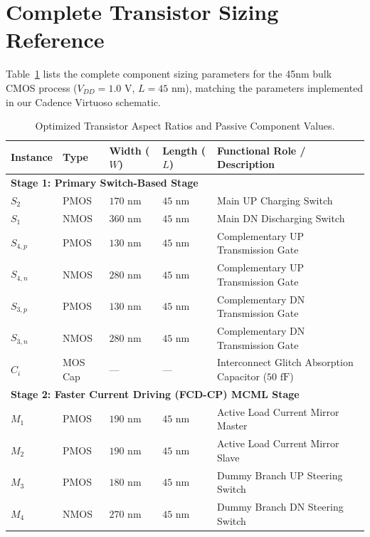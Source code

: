 \documentclass[11pt,a4paper]{report}
\begin{document}
\section{Complete Transistor Sizing Reference}
Table~\ref{tab:sizing_table} lists the complete component sizing parameters for the 45nm bulk CMOS process ($V_{DD} = 1.0\text{ V}$, $L = 45\text{ nm}$), matching the parameters implemented in our Cadence Virtuoso schematic.

\begin{table}[H]
    \centering
    \caption{Optimized Transistor Aspect Ratios and Passive Component Values.}
    \label{tab:sizing_table}
    \begin{tabularx}{\textwidth}{llllX}
        \toprule
        \textbf{Instance} & \textbf{Type} & \textbf{Width ($W$)} & \textbf{Length ($L$)} & \textbf{Functional Role / Description} \\
        \midrule
        \multicolumn{5}{l}{\textbf{Stage 1: Primary Switch-Based Stage}} \\
        $S_2$ & PMOS & $170\text{ nm}$ & $45\text{ nm}$ & Main UP Charging Switch \\
        $S_1$ & NMOS & $360\text{ nm}$ & $45\text{ nm}$ & Main DN Discharging Switch \\
        $S_{4,p}$ & PMOS & $130\text{ nm}$ & $45\text{ nm}$ & Complementary UP Transmission Gate \\
        $S_{4,n}$ & NMOS & $280\text{ nm}$ & $45\text{ nm}$ & Complementary UP Transmission Gate \\
        $S_{3,p}$ & PMOS & $130\text{ nm}$ & $45\text{ nm}$ & Complementary DN Transmission Gate \\
        $S_{3,n}$ & NMOS & $280\text{ nm}$ & $45\text{ nm}$ & Complementary DN Transmission Gate \\
        $C_i$ & MOS Cap & --- & --- & Interconnect Glitch Absorption Capacitor ($50\text{ fF}$) \\
        \midrule
        \multicolumn{5}{l}{\textbf{Stage 2: Faster Current Driving (FCD-CP) MCML Stage}} \\
        $M_1$ & PMOS & $190\text{ nm}$ & $45\text{ nm}$ & Active Load Current Mirror Master \\
        $M_2$ & PMOS & $190\text{ nm}$ & $45\text{ nm}$ & Active Load Current Mirror Slave \\
        $M_3$ & PMOS & $180\text{ nm}$ & $45\text{ nm}$ & Dummy Branch UP Steering Switch \\
        $M_4$ & NMOS & $270\text{ nm}$ & $45\text{ nm}$ & Dummy Branch DN Steering Switch \\

\end{tabularx}
\end{table}
\end{document}
